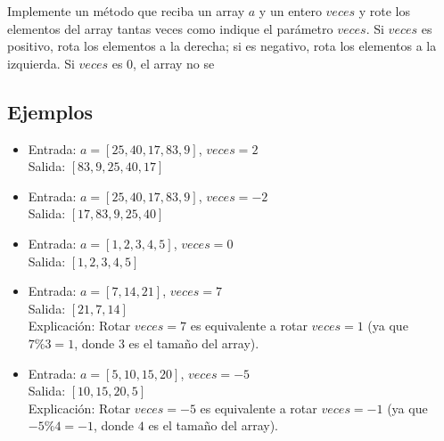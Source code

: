 Implemente un método que reciba un array \(a\) y un entero \(veces\) y rote los elementos del array tantas veces como indique el parámetro \(veces\). Si \(veces\) es positivo, rota los elementos a la derecha; si es negativo, rota los elementos a la izquierda. Si \(veces\) es 0, el array no se %


\subsection*{Ejemplos}

\begin{itemize}
    \item Entrada: \(a = [25, 40, 17, 83, 9]\), \(veces = 2\)\\
    Salida: \([83, 9, 25, 40, 17]\)

    \item Entrada: \(a = [25, 40, 17, 83, 9]\), \(veces = -2\)\\
    Salida: \([17, 83, 9, 25, 40]\)

    \item Entrada: \(a = [1, 2, 3, 4, 5]\), \(veces = 0\)\\
    Salida: \([1, 2, 3, 4, 5]\)

    \item Entrada: \(a = [7, 14, 21]\), \(veces = 7\)\\
    Salida: \([21, 7, 14]\)\\
    Explicación: Rotar \(veces = 7\) es equivalente a rotar \(veces = 1\) (ya que \(7 \% 3 = 1\), donde \(3\) es el tamaño del array). 

    \item Entrada: \(a = [5, 10, 15, 20]\), \(veces = -5\)\\
    Salida: \([10, 15, 20, 5]\)\\
    Explicación: Rotar \(veces = -5\) es equivalente a rotar \(veces = -1\) (ya que \(-5 \% 4 = -1\), donde \(4\) es el tamaño del array). 
\end{itemize}
